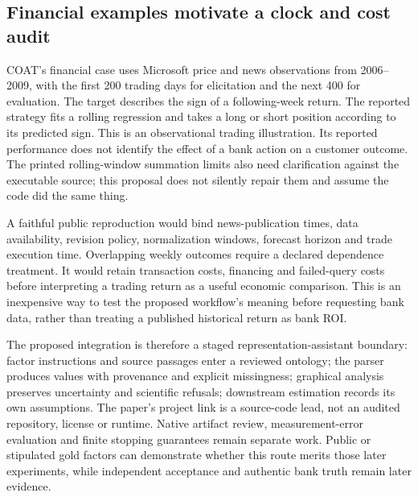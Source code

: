 \subsection{Financial examples motivate a clock and cost audit}
\label{exec19:coat-finance}
COAT's financial case uses Microsoft price and news observations from
2006--2009, with the first 200 trading days for elicitation and the next 400
for evaluation. The target describes the sign of a following-week return.
The reported strategy fits a rolling regression and takes a long or short
position according to its predicted sign. This is an observational trading
illustration. Its reported performance does not identify the effect of a bank
action on a customer outcome. The printed rolling-window summation limits
also need clarification against the executable source; this proposal does not
silently repair them and assume the code did the same thing.~\citep{exec19_coat}

A faithful public reproduction would bind news-publication times, data
availability, revision policy, normalization windows, forecast horizon and
trade execution time. Overlapping weekly outcomes require a declared
dependence treatment. It would retain transaction costs, financing and
failed-query costs before interpreting a trading return as a useful economic
comparison. This is an inexpensive way to test the proposed workflow's
meaning before requesting bank data, rather than treating a published
historical return as bank ROI.

The proposed integration is therefore a staged representation-assistant
boundary: factor instructions and source passages enter a reviewed ontology;
the parser produces values with provenance and explicit missingness; graphical
analysis preserves uncertainty and scientific refusals; downstream estimation
records its own assumptions. The paper's project link is a source-code lead,
not an audited repository, license or runtime. Native artifact review,
measurement-error evaluation and finite stopping guarantees remain separate
work. Public or stipulated gold factors can demonstrate whether this route
merits those later experiments, while independent acceptance and authentic
bank truth remain later evidence.~\citep{exec19_coat,exec19_coat_reference}
